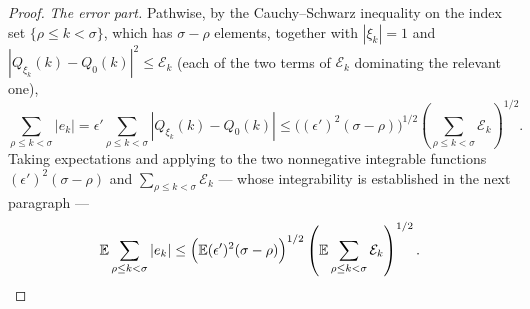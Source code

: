 \begin{proof}
\emph{The error part.} Pathwise, by the Cauchy--Schwarz inequality on the index
set $\{\rho\le k<\sigma\}$, which has $\sigma-\rho$ elements, together with
$|\xi_k|=1$ and $|Q_{\xi_k}(k)-Q_0(k)|^2\le\mathcal E_k$ (each of the two terms
of $\mathcal E_k$ dominating the relevant one),
\begin{equation}\label{eq:sptb-errorpath}
  \sum_{\rho\le k<\sigma}|e_k|
   =\epsilon'\sum_{\rho\le k<\sigma}|Q_{\xi_k}(k)-Q_0(k)|
   \le\bigl((\epsilon')^2(\sigma-\rho)\bigr)^{1/2}
      \left(\sum_{\rho\le k<\sigma}\mathcal E_k\right)^{1/2}.
\end{equation}
Taking expectations and applying
 to the two nonnegative integrable
functions $(\epsilon')^2(\sigma-\rho)$ and $\sum_{\rho\le k<\sigma}\mathcal E_k$
--- whose integrability is established in the next paragraph ---
\begin{equation}\label{eq:sptb-error}
  \mathbb E\sum_{\rho\le k<\sigma}|e_k|
   \le\Bigl(\mathbb E(\epsilon')^2(\sigma-\rho)\Bigr)^{1/2}
      \left(\mathbb E\sum_{\rho\le k<\sigma}\mathcal E_k\right)^{1/2}.
\end{equation}


\end{proof}

